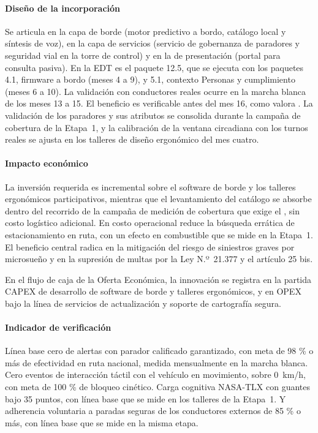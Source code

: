 \paragraph{Diseño de la incorporación} Se articula en la capa de borde (motor predictivo a bordo,
catálogo local y síntesis de voz), en la capa de servicios (servicio de gobernanza de paradores y
seguridad vial en la torre de control) y en la de presentación (portal para consulta pasiva). En la
EDT es el paquete 12.5, que se ejecuta con los paquetes 4.1, firmware a bordo (meses 4 a 9), y 5.1,
contexto Personas y cumplimiento (meses 6 a 10). La validación con conductores reales ocurre en la
marcha blanca de los meses 13 a 15. El beneficio es verificable antes
del mes 16, como valora . La validación de los paradores y sus atributos se
consolida durante la campaña de cobertura de la Etapa~1, y la calibración de la ventana circadiana con
los turnos reales se ajusta en los talleres de diseño ergonómico del mes cuatro.

\paragraph{Impacto económico} La inversión requerida es incremental sobre el software de borde y los
talleres ergonómicos participativos, mientras que el levantamiento del catálogo se absorbe dentro del
recorrido de la campaña de medición de cobertura que exige el , sin costo
logístico adicional. En costo operacional
reduce la búsqueda errática de estacionamiento en ruta, con un efecto en combustible que se mide en la
Etapa~1. El beneficio central radica en la mitigación del riesgo de siniestros graves por microsueño y
en la supresión de multas por la Ley N.º~21.377 y el artículo 25 bis.

En el flujo de caja de la Oferta Económica, la innovación se registra en la partida CAPEX de desarrollo de software de borde y talleres ergonómicos, y en OPEX bajo la línea de servicios de actualización y soporte de cartografía segura.

\paragraph{Indicador de verificación} Línea base cero de alertas con parador calificado garantizado,
con meta de 98 \% o más de efectividad en ruta nacional, medida mensualmente en la marcha blanca. Cero
eventos de interacción táctil con el vehículo en movimiento, sobre 0~km/h, con meta de 100 \% de
bloqueo cinético.
Carga cognitiva NASA-TLX con guantes bajo 35 puntos, con línea base que se mide en los talleres de la
Etapa~1. Y adherencia voluntaria a paradas seguras de los conductores externos de 85 \% o más, con
línea base que se mide en la misma etapa.

